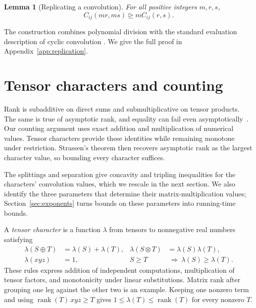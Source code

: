 \documentclass[11pt]{article}
\newtheorem{lemma}[theorem]{Lemma}
\newcommand{\rank}{\operatorname{rank}}
\newcommand{\degen}{\unrhd}
\begin{document}
\begin{lemma}[Replicating a convolution]\label{lem:replication}
For all positive integers $m,r,s$,
\begin{equation}\label{eq:replication}
 C_{ij}(mr,ms)\degen mC_{ij}(r,s).
\end{equation}
\end{lemma}

The construction combines polynomial division with the standard evaluation
description of cyclic convolution
\cite[Theorem~5 and Section~5.1]{ju-solomonik-2020-convolution}.
We give the full proof in Appendix~\ref{app:replication}.

\section{Tensor characters and counting}\label{sec:discrete}

Rank is subadditive on direct sums and submultiplicative on tensor
products. The same is true of asymptotic rank, and equality can fail even
asymptotically~\cite[Section~4.1]{wigderson-zuiddam-2025-asymptotic-spectra}.
Our counting argument uses exact addition and multiplication of numerical
values. Tensor characters provide these identities while remaining
monotone under restriction. Strassen's theorem then recovers asymptotic
rank as the largest character value, so bounding every character suffices.

The splittings and separation give concavity and tripling inequalities
for the characters' convolution values, which we rescale in the next
section. We also identify the three parameters that determine their
matrix-multiplication values; Section~\ref{sec:exponents} turns bounds on
these parameters into running-time bounds.

A \emph{tensor character} is a function $\lambda$ from tensors to
nonnegative real numbers satisfying
\begin{equation}\label{eq:character-rules}
\begin{aligned}
 \lambda(S\oplus T)&=\lambda(S)+\lambda(T),&
 \lambda(S\otimes T)&=\lambda(S)\lambda(T),\\
 \lambda(xyz)&=1,&
 S\ge T&\ \Longrightarrow\ \lambda(S)\ge\lambda(T).
\end{aligned}
\end{equation}
These rules express addition of independent computations, multiplication
of tensor factors, and monotonicity under linear substitutions. Matrix
rank after grouping one leg against the other two is an example.
Keeping one nonzero term and using $\rank(T)\,xyz\ge T$ gives
$1\le\lambda(T)\le\rank(T)$ for every nonzero $T$.
\end{document}
